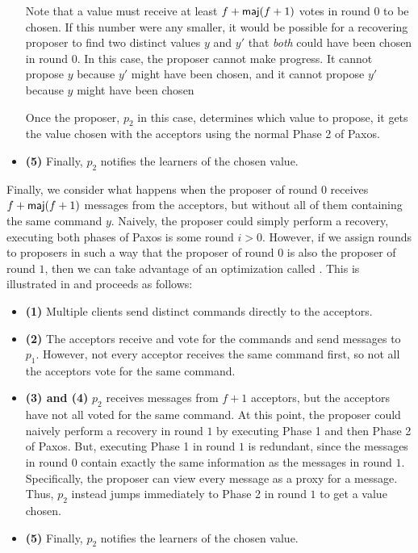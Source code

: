 \begin{itemize}
    Note that a value must receive at least $f + \textsf{maj}(f+1)$ votes in round $0$
    to be chosen. If this number were any smaller, it would be possible for a
    recovering proposer to find two distinct values $y$ and $y'$ that
    \emph{both} could have been chosen in round $0$. In this case, the proposer
    cannot make progress. It cannot propose $y$ because $y'$ might have been
    chosen, and it cannot propose $y'$ because $y$ might have been chosen

    Once the proposer, $p_2$ in this case, determines which value to propose,
    it gets the value chosen with the acceptors using the normal Phase 2 of
    Paxos.

  \item \textbf{(5)}
    Finally, $p_2$ notifies the learners of the chosen value.
\end{itemize}

Finally, we consider what happens when the proposer of round $0$ receives $f +
\textsf{maj}(f+1)$  messages from the acceptors, but without all of
them containing the same command $y$. Naively, the proposer could simply
perform a recovery, executing both phases of Paxos is some round $i > 0$.
However, if we assign rounds to proposers in such a way that the proposer of
round $0$ is also the proposer of round $1$, then we can take advantage of an
optimization called . This is illustrated in
 and proceeds as follows:

\begin{itemize}
  \item \textbf{(1)}
    Multiple clients send distinct commands directly to the acceptors.

  \item \textbf{(2)}
    The acceptors receive and vote for the commands and send 
    messages to $p_1$. However, not every acceptor receives the same command
    first, so not all the acceptors vote for the same command.

  \item \textbf{(3) and (4)}
    $p_2$ receives  messages from $f+1$ acceptors, but the
    acceptors have not all voted for the same command. At this point, the
    proposer could naively perform a recovery in round $1$ by executing Phase 1
    and then Phase 2 of Paxos. But, executing Phase 1 in round $1$ is
    redundant, since the  messages in round $0$ contain
    exactly the same information as the  messages in round
    $1$. Specifically, the proposer can view every  message
    as a proxy for a  message. Thus, $p_2$ instead jumps
    immediately to Phase 2 in round $1$ to get a value chosen.

  \item \textbf{(5)}
    Finally, $p_2$ notifies the learners of the chosen value.
\end{itemize}
